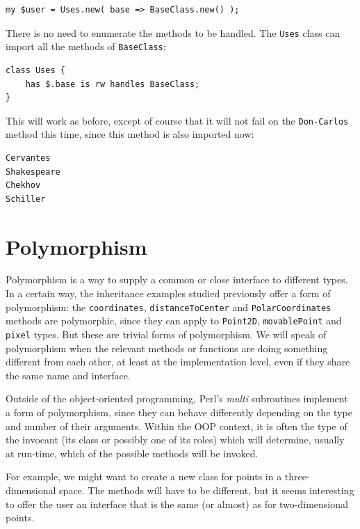 \begin{verbatim}
my $user = Uses.new( base => BaseClass.new() );
\end{verbatim}

There is no need to enumerate the methods to be handled. The 
{\tt Uses} class can import all the methods of {\tt BaseClass}:

\begin{verbatim}
class Uses { 
    has $.base is rw handles BaseClass;
}
\end{verbatim}

This will work as before, except of course that it will not fail 
on the {\tt Don-Carlos} method this time, since this method is 
also imported now:

\begin{verbatim}
Cervantes
Shakespeare
Chekhov
Schiller
\end{verbatim} 

\section{Polymorphism}

Polymorphism is a way to supply a common or close interface 
to different types. In a certain way, the inheritance examples 
studied previously offer a form of polymorphism: the 
{\tt coordinates}, {\tt distanceToCenter} and {\tt PolarCoordinates} 
methods are polymorphic, since they can apply to 
{\tt Point2D}, {\tt movablePoint} and {\tt pixel} types. But 
these are trivial forms of polymorphism. We will speak of 
polymorphism when the relevant methods or functions are 
doing something different from each other, at least at the 
implementation level, even if they share the same name and 
interface.

Outside of the object-oriented programming, Perl's 
\emph{multi} subroutines implement a form of polymorphism, 
since they can behave differently depending on the 
type and number of their arguments. Within the OOP context, 
it is often the type of the invocant (its class or possibly one 
of its roles) which will determine, usually at run-time, 
which of the possible methods will be invoked.

For example, we might want to create a new class for points 
in a three-dimensional space. The methods will have to be 
different, but it seems interesting to offer the user an 
interface that is the same (or almost) as for two-dimensional 
points.  

